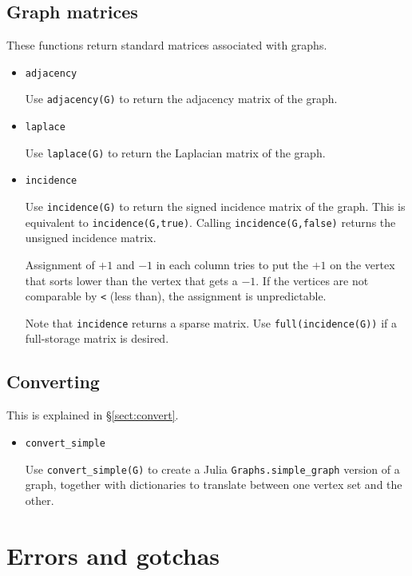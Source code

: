 \documentclass[oneside]{amsart}
\begin{document}
\subsection*{Graph matrices}

These functions return standard matrices associated with graphs.

\begin{itemize}
\item \verb|adjacency|

  Use \verb|adjacency(G)| to return the adjacency matrix of the graph.

\item \verb|laplace|

  Use \verb|laplace(G)| to return the Laplacian matrix of the graph.

\item \verb|incidence|

  Use \verb|incidence(G)| to return the signed incidence matrix of the
  graph. This is equivalent to \verb|incidence(G,true)|. Calling
  \verb|incidence(G,false)| returns the unsigned incidence matrix.

  Assignment of $+1$ and $-1$ in each column tries to put the $+1$ on
  the vertex that sorts lower than the vertex that gets a $-1$. If the
  vertices are not comparable by \verb|<| (less than), the assignment
  is unpredictable.

  Note that \verb|incidence| returns a sparse matrix. Use
  \verb|full(incidence(G))| if a full-storage matrix is desired.
\end{itemize}

\subsection*{Converting}

This is explained in \S\ref{sect:convert}.

\begin{itemize}
\item \verb|convert_simple|

  Use \verb|convert_simple(G)| to create a Julia
  \verb|Graphs.simple_graph| version of a graph, together with
  dictionaries to translate between one vertex set and the other.
\end{itemize}

\section{Errors and gotchas}
\end{document}

